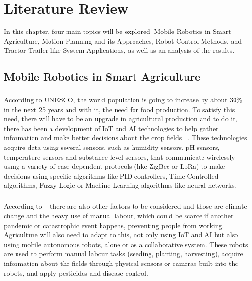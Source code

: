 
%



\chapter{Literature Review}
\label{cha:LR}

\glsresetall

In this chapter, four main topics will be explored: Mobile Robotics in Smart Agriculture, 
Motion Planning and its Approaches, Robot Control Methods, and Tractor-Trailer-like System Applications, 
as well as an analysis of the results.

\section{Mobile Robotics in Smart Agriculture}
\label{sec:MRSM}
\paragraph{}According to UNESCO, the world population is going to increase by about 30\%
in the next 25 years and with it, the need for food production. To satisfy this need, there will 
have to be an upgrade in agricultural production and to do it, there has been a development of IoT and AI
technologies to help gather information and make better decisions about the crop fields ~\cite{9716089}. 
These technologies acquire data using several sensors, such as humidity sensors, pH sensors, 
temperature sensors and substance level sensors, that communicate wirelessly using a variety 
of case dependent protocols (like ZigBee or LoRa) to make decisions using specific algorithms 
like PID controllers, Time-Controlled algorithms, Fuzzy-Logic or Machine Learning algorithms like neural networks.

\paragraph{}According to ~\cite{robotics10020052, article34} there are also other factors to be considered and those are climate change and the heavy use 
of manual labour, which could be scarce if another pandemic or catastrophic event happens, preventing people from working. Agriculture will also 
need to adapt to this, not only using IoT and AI but also using mobile autonomous robots, alone or as a collaborative system. 
These robots are used to perform manual labour tasks (seeding, planting, harvesting), acquire information 
about the fields through physical sensors or cameras built into the robots, and apply pesticides and disease control.


